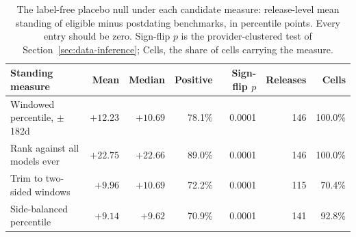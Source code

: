 \begin{table}[!htb]
\centering
\small
\setlength{\tabcolsep}{4pt}
\begin{tabular}{lrrrrrr}
\toprule
Standing measure & Mean & Median & Positive & Sign-flip $p$ & Releases & Cells \\
\midrule
Windowed percentile, $\pm$182d & $+12.23$ & $+10.69$ & 78.1\% & 0.0001 & 146 & 100.0\% \\
Rank against all models ever & $+22.75$ & $+22.66$ & 89.0\% & 0.0001 & 146 & 100.0\% \\
Trim to two-sided windows & $+9.96$ & $+10.69$ & 72.2\% & 0.0001 & 115 & 70.4\% \\
Side-balanced percentile & $+9.14$ & $+9.62$ & 70.9\% & 0.0001 & 141 & 92.8\% \\
\bottomrule
\end{tabular}
\caption{%
The label-free placebo null under each candidate measure: release-level mean standing of eligible minus postdating benchmarks, in percentile points. Every entry should be zero. Sign-flip $p$ is the provider-clustered test of Section~\ref{sec:data-inference}; Cells, the share of cells carrying the measure.}
\label{tab:remedies}
\end{table}
